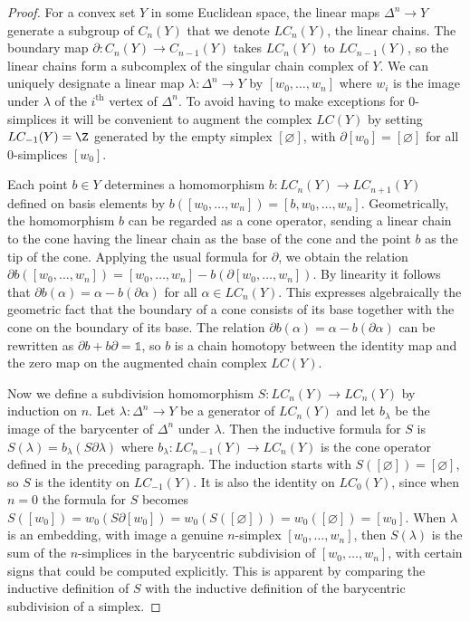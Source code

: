 \begin{proof}
For a convex set $Y$ in some Euclidean space, the linear maps $\Delta^n\to Y$ generate a subgroup of $C_n(Y)$ that we denote $LC_n(Y)$, the linear chains. The boundary map $\partial:C_n(Y)\to C_{n-1}(Y)$ takes $LC_n(Y)$ to $LC_{n-1}(Y)$, so the linear chains form a subcomplex of the singular chain complex of $Y$. We can uniquely designate a linear map $\lambda:\Delta^n\to Y$ by $[w_0,\ldots,w_n]$ where $w_i$ is the image under $\lambda$ of the $i^{\text{th}}$ vertex of $\Delta^n$. To avoid having to make exceptions for $0$-simplices it will be convenient to augment the complex $LC(Y)$ by setting $LC_{-1}(Y) = \Z$ generated by the empty simplex $[\varnothing]$, with $\partial[w_0] = [\varnothing]$ for all $0$-simplices $[w_0]$.

Each point $b \in Y$ determines a homomorphism $b:LC_n(Y)\to LC_{n+1}(Y)$ defined on basis elements by $b([w_0,\ldots,w_n]) = [b,w_0,\ldots,w_n]$. Geometrically, the homomorphism $b$ can be regarded as a cone operator, sending a linear chain to the cone having the linear chain as the base of the cone and the point $b$ as the tip of the cone. Applying the usual formula for $\partial$, we obtain the relation $\partial b([w_0,\ldots,w_n]) = [w_0,\ldots,w_n] - b(\partial[w_0,\ldots,w_n])$. By linearity it follows that $\partial b(\alpha) = \alpha - b(\partial\alpha)$ for all $\alpha \in LC_n(Y)$. This expresses algebraically the geometric fact that the boundary of a cone consists of its base together with the cone on the boundary of its base. The relation $\partial b(\alpha) = \alpha - b(\partial\alpha)$ can be rewritten as $\partial b + b\partial = \mathbb{1}$, so $b$ is a chain homotopy between the identity map and the zero map on the augmented chain complex $LC(Y)$.

Now we define a subdivision homomorphism $S:LC_n(Y)\to LC_n(Y)$ by induction on $n$. Let $\lambda:\Delta^n\to Y$ be a generator of $LC_n(Y)$ and let $b_\lambda$ be the image of the barycenter of $\Delta^n$ under $\lambda$. Then the inductive formula for $S$ is $S(\lambda) = b_\lambda(S\partial\lambda)$ where $b_\lambda:LC_{n-1}(Y)\to LC_n(Y)$ is the cone operator defined in the preceding paragraph. The induction starts with $S([\varnothing]) = [\varnothing]$, so $S$ is the identity on $LC_{-1}(Y)$. It is also the identity on $LC_0(Y)$, since when $n=0$ the formula for $S$ becomes $S([w_0]) = w_0(S\partial[w_0]) = w_0(S([\varnothing])) = w_0([\varnothing]) = [w_0]$. When $\lambda$ is an embedding, with image a genuine $n$-simplex $[w_0,\ldots,w_n]$, then $S(\lambda)$ is the sum of the $n$-simplices in the barycentric subdivision of $[w_0,\ldots,w_n]$, with certain signs that could be computed explicitly. This is apparent by comparing the inductive definition of $S$ with the inductive definition of the barycentric subdivision of a simplex.


\end{proof}
